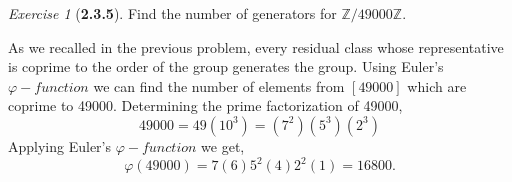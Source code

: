 \documentclass[12pt]{amsart}
\makeatletter
\theoremstyle{remark}
\newtheorem*{exercise}{Exercise}%
\def\ZZ{\ensuremath{\mathbb Z}}
\renewenvironment{proof}[1][\proofname]{\par\doublespacing
  \pushQED{\qed}%
  \normalfont \topsep6\p@\@plus6\p@\relax
  \list{}{%
    \settowidth{\leftmargin}{\itshape\proofname:\hskip\labelsep}%
    \setlength{\labelwidth}{0pt}%
    \setlength{\itemindent}{-\leftmargin}%
  }%
  \item[\hskip\labelsep\itshape#1\@addpunct{:}]\ignorespaces
}{%
  \popQED\endlist\@endpefalse
  \singlespacing
}
\theoremstyle{mycomment}
\makeatother
\begin{document}
\thispagestyle{fancy}
\author{Coordinator: Sasha}






\begin{exercise}[\textbf{2.3.5}] Find the number of generators for $\ZZ/49000\ZZ$.
  \begin{proof}[Solution] As we recalled in the previous problem, every residual class whose representative is coprime to the 
    order of the group generates the group. Using Euler's $\varphi-function$ we can find the number of elements from $[49000]$ which 
    are coprime to 49000. Determining the prime factorization of 49000, 
    \begin{equation*}
      49000 = 49(10^3) = (7^2)(5^3)(2^3)
    \end{equation*}
    Applying Euler's $\varphi-function$ we get, 
    \begin{equation*}
      \varphi(49000) = 7(6)5^2(4)2^2(1) = 16800.
    \end{equation*}
    \end{proof}
\end{exercise}
\vspace{.15in}
\end{document}
